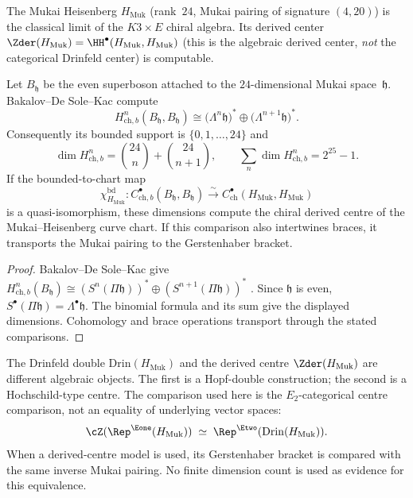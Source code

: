 The Mukai Heisenberg $H_{\mathrm{Muk}}$ (rank~$24$, Mukai
pairing of signature $(4, 20)$) is the classical limit of the
$K3 \times E$ chiral algebra. Its derived center
$\Zder(H_{\mathrm{Muk}}) = \HH^\bullet(H_{\mathrm{Muk}}, H_{\mathrm{Muk}})$
(this is the algebraic derived center, \emph{not} the
categorical Drinfeld center) is computable.

\begin{proposition}
\label{prop:derived-center-h-muk}
Let $B_{\mathfrak h}$ be the even superboson attached to the
$24$-dimensional Mukai space~$\mathfrak h$.  Bakalov--De Sole--Kac
compute
\[
 H^n_{\mathrm{ch},b}(B_{\mathfrak h},B_{\mathfrak h})
 \cong
 \bigl(\Lambda^n\mathfrak h\bigr)^*
 \oplus
 \bigl(\Lambda^{n+1}\mathfrak h\bigr)^*.
\]
Consequently its bounded support is $\{0,1,\ldots,24\}$ and
\[
 \dim H^n_{\mathrm{ch},b}
 =\binom{24}{n}+\binom{24}{n+1},
 \qquad
 \sum_n\dim H^n_{\mathrm{ch},b}=2^{25}-1.
\]
If the bounded-to-chart map
\[
 \chi^{\mathrm{bd}}_{H_{\mathrm{Muk}}}\colon
 C^\bullet_{\mathrm{ch},b}(B_{\mathfrak h},B_{\mathfrak h})
 \xrightarrow{\sim}
 C^\bullet_{\mathrm{ch}}(H_{\mathrm{Muk}},H_{\mathrm{Muk}})
\]
is a quasi-isomorphism, these dimensions compute the chiral derived
centre of the Mukai--Heisenberg curve chart.  If this comparison also
intertwines braces, it transports the Mukai pairing to the
Gerstenhaber bracket.
\end{proposition}

\begin{proof}
Bakalov--De Sole--Kac give
$H^n_{\mathrm{ch},b}(B_{\mathfrak h})
\cong(S^n(\Pi\mathfrak h))^*\oplus
(S^{n+1}(\Pi\mathfrak h))^*$
\cite[Theorem~7.4]{BDSK21}.  Since $\mathfrak h$ is even,
$S^\bullet(\Pi\mathfrak h)=\Lambda^\bullet\mathfrak h$.
The binomial formula and its sum give the displayed dimensions.
Cohomology and brace operations transport through the stated
comparisons.
\end{proof}

\begin{remark}
\label{rem:drinfeld-vs-derived-k3e}
The Drinfeld double \(\mathrm{Drin}(H_{\mathrm{Muk}})\) and the derived
centre \(\Zder(H_{\mathrm{Muk}})\) are different algebraic objects. The
first is a Hopf-double construction; the second is a Hochschild-type
centre. The comparison used here is the \(E_2\)-categorical centre
comparison, not an equality of underlying vector spaces:
\[
 \cZ(\Rep^{\Eone}(H_{\mathrm{Muk}}))
 \;\simeq\;
 \Rep^{\Etwo}(\mathrm{Drin}(H_{\mathrm{Muk}})).
\]
When a derived-centre model is used, its Gerstenhaber bracket is
compared with the same inverse Mukai pairing. No finite dimension count
is used as evidence for this equivalence.
\end{remark}


